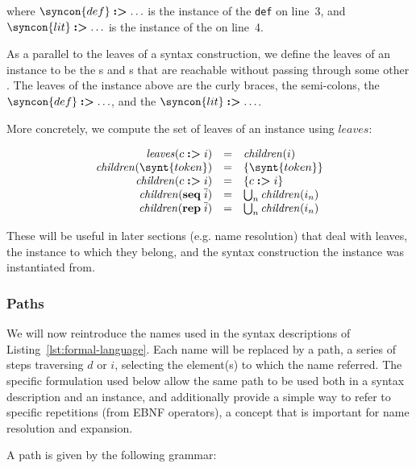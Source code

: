 \documentclass{kththesis}
\newcommand{\ssynt}[1]{\ensuremath{\mathit{#1}}}
\begin{document}
where $\syncon{def} \tagged \ldots$ is the instance of the \texttt{def} on line~3, and $\syncon{lit} \tagged \ldots$ is the instance of the  on line~4.

As a parallel to the leaves of a syntax construction, we define the leaves of an instance to be the s and s that are reachable without passing through some other . The leaves of the  instance above are the curly braces, the semi-colons, the $\syncon{def} \tagged \ldots$, and the $\syncon{lit} \tagged \ldots$.

\newcommand{\leaves}{\ensuremath{\mathit{leaves}}}

More concretely, we compute the set of leaves of an instance using \leaves:

\newcommand{\children}{\ensuremath{\mathit{children}}}
$$
\begin{array}{rcl}
\leaves(c \tagged i) & = & \children(i) \\
\children(\synt{token}) & = & \{\synt{token}\} \\
\children(c \tagged i) & = & \{c \tagged i\} \\
\children(\seq \overline{i}) & = & \bigcup_n \children(i_n) \\
\children(\repseq \overline{i}) & = & \bigcup_n \children(i_n) \\
\end{array}
$$
\let\children\undefined

These will be useful in later sections (e.g. name resolution) that deal with leaves, the instance to which they belong, and the syntax construction the instance was instantiated from.

\subsubsection{Paths}

We will now reintroduce the names used in the syntax descriptions of Listing~\ref{lst:formal-language}. Each name will be replaced by a path, a series of steps traversing \ssynt{d} or \ssynt{i}, selecting the element(s) to which the name referred. The specific formulation used below allow the same path to be used both in a syntax description and an instance, and additionally provide a simple way to refer to specific repetitions (from EBNF operators), a concept that is important for name resolution and expansion.

A path is given by the following grammar:
\end{document}
